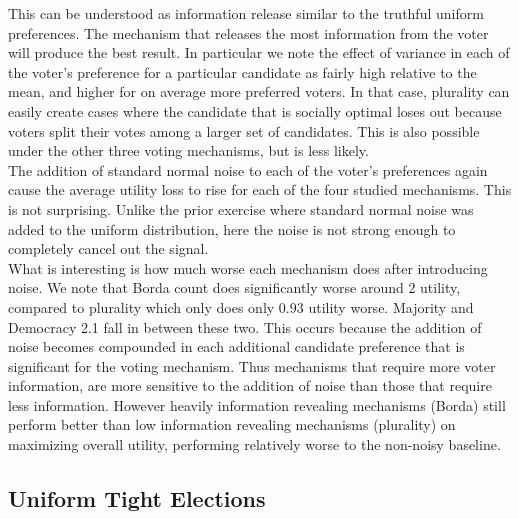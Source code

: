 \documentclass[11pt]{scrartcl}
\begin{document}
This can be understood as information release similar to the truthful uniform preferences. The mechanism that releases the most information from the voter will produce the best result. In particular we note the effect of variance in each of the voter's preference for a particular candidate as fairly high relative to the mean, and higher for on average more preferred voters. In that case, plurality can easily create cases where the candidate that is socially optimal loses out because voters split their votes among a larger set of candidates. This is also possible under the other three voting mechanisms, but is less likely.\\

The addition of standard normal noise to each of the voter's preferences again cause the average utility loss to rise for each of the four studied mechanisms. This is not surprising. Unlike the prior exercise where standard normal noise was added to the uniform distribution, here the noise is not strong enough to completely cancel out the signal.\\

What is interesting is how much worse each mechanism does after introducing noise. We note that Borda count does significantly worse around 2 utility, compared to plurality which only does only 0.93 utility worse. Majority and Democracy 2.1 fall in between these two. This occurs because the addition of noise becomes compounded in each additional candidate preference that is significant for the voting mechanism. Thus mechanisms that require more voter information, are more sensitive to the addition of noise than those that require less information. However heavily information revealing mechanisms (Borda) still perform better than low information revealing mechanisms (plurality) on maximizing overall utility, performing relatively worse to the non-noisy baseline.


\subsection{Uniform Tight Elections}
\end{document}
